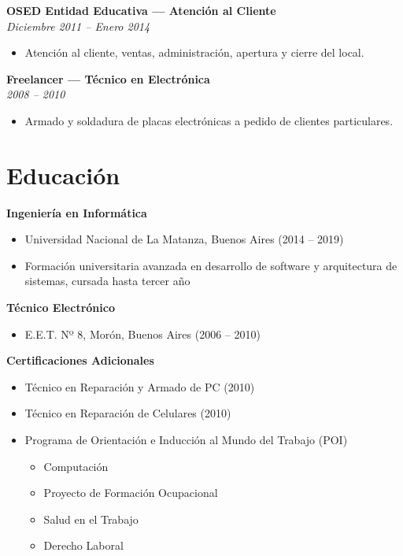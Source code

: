 \documentclass[11pt,a4paper]{article}
\newcommand{\jobtitle}[2]{
    \noindent\textbf{#1}\\
    \textit{#2}\par\vspace{0.5em}
}
\begin{document}
\jobtitle{OSED Entidad Educativa — Atención al Cliente}{Diciembre 2011 – Enero 2014}
\begin{itemize}[leftmargin=*]
    \item Atención al cliente, ventas, administración, apertura y cierre del local.
\end{itemize}

\jobtitle{Freelancer — Técnico en Electrónica}{2008 – 2010}
\begin{itemize}[leftmargin=*]
    \item Armado y soldadura de placas electrónicas a pedido de clientes particulares.
\end{itemize}

\section{Educación}

\textbf{Ingeniería en Informática}
\begin{itemize}[leftmargin=*]
    \item Universidad Nacional de La Matanza, Buenos Aires (2014 – 2019)
    \item Formación universitaria avanzada en desarrollo de software y arquitectura de sistemas, cursada hasta tercer año
\end{itemize}

\textbf{Técnico Electrónico}
\begin{itemize}[leftmargin=*]
    \item E.E.T. Nº 8, Morón, Buenos Aires (2006 – 2010)
\end{itemize}

\textbf{Certificaciones Adicionales}
\begin{itemize}[leftmargin=*]
    \item Técnico en Reparación y Armado de PC (2010)
    \item Técnico en Reparación de Celulares (2010)
    \item Programa de Orientación e Inducción al Mundo del Trabajo (POI)
    \begin{itemize}
        \item Computación
        \item Proyecto de Formación Ocupacional
        \item Salud en el Trabajo
        \item Derecho Laboral
    \end{itemize}
\end{itemize}
\end{document}
